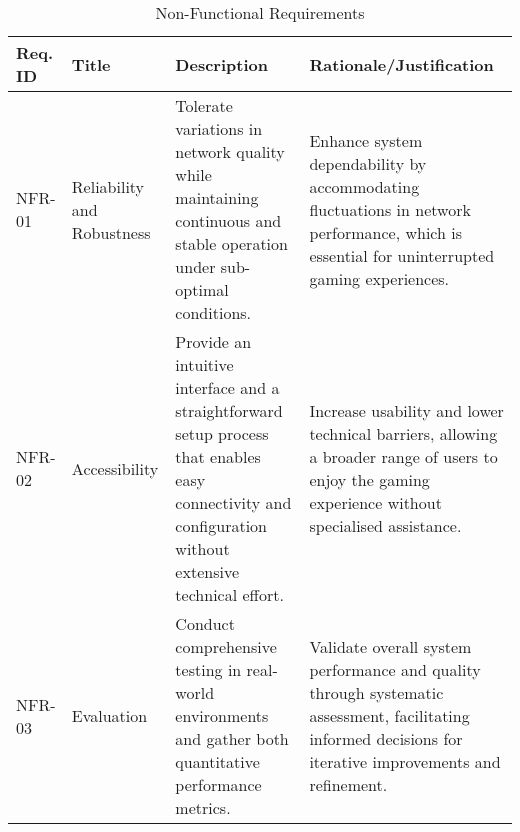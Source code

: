 \begin{table}[!ht]
    \centering
    \begin{tabular}{|p{1cm}|p{3cm}|p{5cm}|p{6cm}|}
    \hline
        Req. ID & Title & Description & Rationale/Justification \\ \hline
        NFR-01 & Reliability and Robustness & Tolerate variations in network quality while maintaining continuous and stable operation under sub-optimal conditions. & Enhance system dependability by accommodating fluctuations in network performance, which is essential for uninterrupted gaming experiences. \\ \hline
        NFR-02 & Accessibility & Provide an intuitive interface and a straightforward setup process that enables easy connectivity and configuration without extensive technical effort. & Increase usability and lower technical barriers, allowing a broader range of users to enjoy the gaming experience without specialised assistance. \\ \hline
        NFR-03 & Evaluation & Conduct comprehensive testing in real-world environments and gather both quantitative performance metrics. & Validate overall system performance and quality through systematic assessment, facilitating informed decisions for iterative improvements and refinement. \\ \hline
    \end{tabular}
    \caption{Non-Functional Requirements}
    \label{tab:non-functional-requirements}
\end{table}
